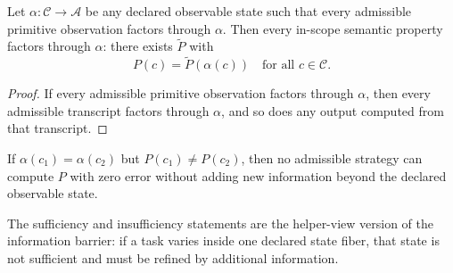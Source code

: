 \begin{theorem}\label{thm:model-completeness}
Let $\alpha : \mathcal C \to \mathcal A$ be any declared observable state such that every admissible primitive observation factors through $\alpha$. Then every in-scope semantic property factors through $\alpha$: there exists $\tilde P$ with
\[
P(c)=\tilde P(\alpha(c)) \quad \text{for all } c\in\mathcal C.
\]
\end{theorem}

\begin{proof}
If every admissible primitive observation factors through $\alpha$, then every admissible transcript factors through $\alpha$, and so does any output computed from that transcript.
\end{proof}

\begin{corollary}\label{cor:fixed-axis-incompleteness}
If $\alpha(c_1)=\alpha(c_2)$ but $P(c_1)\neq P(c_2)$, then no admissible strategy can compute $P$ with zero error without adding new information beyond the declared observable state.
\end{corollary}

\begin{remark}[Interpretation]
The sufficiency and insufficiency statements are the helper-view version of the information barrier: if a task varies inside one declared state fiber, that state is not sufficient and must be refined by additional information.
\end{remark}
